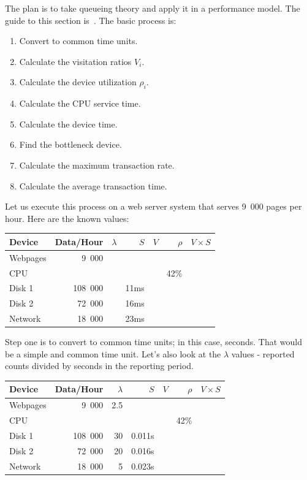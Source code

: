 The plan is to take queueing theory and apply it in a performance model. The guide to this section is~\cite{williams-perf}. The basic process is:

\begin{enumerate}[noitemsep]
	\item Convert to common time units.
	\item Calculate the visitation ratios $V_{i}$.
	\item Calculate the device utilization $\rho_{i}$.
	\item Calculate the CPU service time.
	\item Calculate the device time.
	\item Find the bottleneck device.
	\item Calculate the maximum transaction rate.
	\item Calculate the average transaction time.
\end{enumerate}

Let us execute this process on a web server system that serves 9~000 pages per hour. Here are the known values:

\begin{center}
\begin{tabular}{l|r|r|r|r|r|r} 
	\textbf{Device} & \textbf{Data/Hour} & \textbf{$\lambda$} & \textbf{$S$} & \textbf{$V$} & \textbf{$\rho$} & \textbf{$V \times S$} \\ \hline
	Webpages & 9~000 & & & & & \\ \hline
	CPU & & & & &  42\% & \\ \hline
	Disk 1 & 108~000 & & 11ms & & &\\ \hline
	Disk 2 & 72~000 & & 16ms & & &\\ \hline
	Network & 18~000 & & 23ms & & &
\end{tabular}
\end{center}

Step one is to convert to common time units; in this case, seconds. That would be a simple and common time unit. Let's also look at the $\lambda$ values - reported counts divided by seconds in the reporting period.

\begin{center}
\begin{tabular}{l|r|r|r|r|r|r} 
	\textbf{Device} & \textbf{Data/Hour} & \textbf{$\lambda$} & \textbf{$S$} & \textbf{$V$} & \textbf{$\rho$} & \textbf{$V \times S$} \\ \hline
	Webpages & 9~000 & 2.5 & & & & \\ \hline
	CPU & & & & & 42\% & \\ \hline
	Disk 1 & 108~000 & 30 & 0.011s  & & &\\ \hline
	Disk 2 & 72~000 & 20 & 0.016s & & &\\ \hline
	Network & 18~000 & 5 & 0.023s & & &
\end{tabular}
\end{center}

